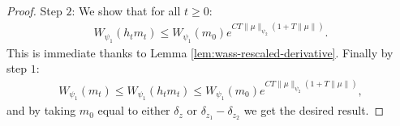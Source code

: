\documentclass[11pt,a4paper]{article}
\newcommand{\RRP}{\mathbb{R}^+_*}
\newcommand{\brac}[1]{\left\langle#1\right\rangle}
\newcommand{\dd}{\mathop{}\!\mathrm{d}}
\begin{document}
\begin{proof}
    Step $2$: We show that for all $t \geq 0$:
    \begin{align*}
        W_{\psi_1}\left(h_tm_t\right) \leq W_{\psi_1}\left(m_0\right) e^{CT\|\mu\|_{\psi_2}\left(1 + T\|\mu\|\right)}.
    \end{align*}
    This is immediate thanks to Lemma \ref{lem:wass-rescaled-derivative}. Finally by step $1$:
    \begin{align*}
        W_{\psi_1}(m_t) \leq W_{\psi_1}(h_t m_t) \leq W_{\psi_1}\left(m_0\right) e^{CT\|\mu\|_{\psi_2}\left(1 + T\|\mu\|\right)},
    \end{align*}
    and by taking $m_0$ equal to either $\delta_z$ or $\delta_{z_1}-\delta_{z_2}$ we get the desired result.

\end{proof}
\end{document}
